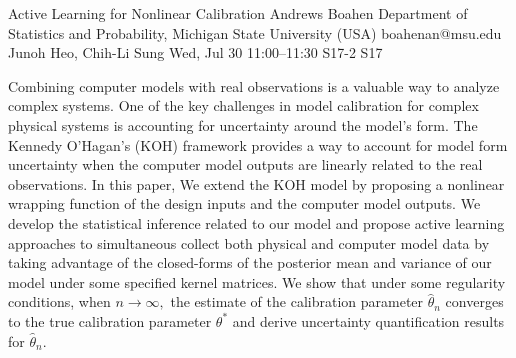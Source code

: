 \begin{talk}
  {Active Learning for Nonlinear Calibration}%
  {Andrews Boahen}%
  {Department of Statistics and Probability, Michigan State University (USA)}%
  {boahenan@msu.edu}%
  {Junoh Heo, Chih-Li Sung}%
  {}%
  {Wed, Jul 30 11:00–11:30}%
  {S17-2}%
  {S17}%
  
				
			
Combining computer models with real observations is a valuable way to analyze complex systems. One of the key challenges in model calibration for complex physical systems is accounting for uncertainty around the model's form. The Kennedy O'Hagan's (KOH) framework provides a way to account for model form uncertainty when the computer model outputs are linearly related to the real observations. In this paper, We extend the KOH model by proposing a nonlinear wrapping function of the design inputs and the computer model outputs. We develop the statistical inference related to our model and propose active learning approaches to simultaneous collect both physical and computer model data by taking advantage of the closed-forms of the posterior mean and variance of our model under some specified kernel matrices. We show that under some regularity conditions, when $n\rightarrow\infty,$ the estimate of the calibration parameter $\hat{\theta}_n$ converges  to  the true calibration parameter $\theta^*$ and derive uncertainty quantification results for $\hat{\theta}_n.$
\medskip


\end{talk}

